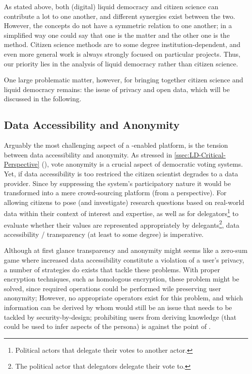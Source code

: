 As stated above, both (digital) liquid democracy and citizen science can contribute a lot to one another, and different synergies exist between the two. However, the concepts do not have a symmetric relation to one another; in a simplified way one could say that one is the matter and the other one is the method. Citizen science methods are to some degree institution-dependent, and even more general work is always strongly focused on particular projects. Thus, our priority lies in the analysis of liquid democracy rather than citizen science.

One large problematic matter, however, for bringing together citizen science and liquid democracy remains: the issue of privacy and open data, which will be discussed in the following.


\subsection{Data Accessibility and Anonymity}
\label{ssec:Integration_AccessibilityAnonymity}

Arguably the most challenging aspect of a -enabled  platform, is the tension between data accessibility and anonymity. As stressed in \ref{ssec:LD-Critical-Perspective} (), vote anonymity is a crucial aspect of democratic voting systems. Yet, if data accessibility is too restriced the citizen scientist degrades to a data provider. Since by suppressing the system’s participatory nature it would be transformed into a mere crowd-sourcing platform (from a  perspective). For allowing citizens to pose (and investigate) research questions based on real-world data within their context of interest and expertise, as well as for delegators\footnote{Political actors that delegate their votes to another actor.} to evaluate whether their values are represented appropriately by delegants\footnote{The political actor that delegators delegate their vote to.}, data accessibility / transparency (at least to some degree) is imperative.

Although at first glance transparency and anonymity might seems like a zero-sum game where increased data accessibility constitute a violation of a user’s privacy, a number of strategies do exists that tackle these problems. With proper encryption techniques, such as homologous encryption, these problem might be solved, since required operations could be performed wile preserving user anonymity; However, no appropriate operators exist for this problem, and which information can be derived by whom would still be an issue that needs to be tackled by security-by-design; prohibiting users from deriving knowledge (that could be used to infer aspects of the persona) is against the point of .

